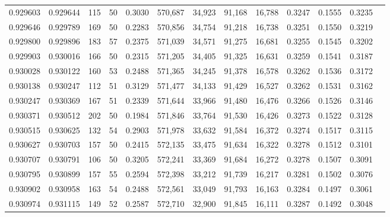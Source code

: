 \begin{tabular}{rrrrrrrrrrrrr}
0.929603 & 0.929644 &   115 &  50 &                                     0.3030 & 570,687 &  34,923 &  91,168 &  16,788 & 0.3247 & 0.1555 & 0.3235 \\
0.929646 & 0.929789 &   169 &  50 &                                     0.2283 & 570,856 &  34,754 &  91,218 &  16,738 & 0.3251 & 0.1550 & 0.3219 \\
0.929800 & 0.929896 &   183 &  57 &                                     0.2375 & 571,039 &  34,571 &  91,275 &  16,681 & 0.3255 & 0.1545 & 0.3202 \\
0.929903 & 0.930016 &   166 &  50 &                                     0.2315 & 571,205 &  34,405 &  91,325 &  16,631 & 0.3259 & 0.1541 & 0.3187 \\
0.930028 & 0.930122 &   160 &  53 &                                     0.2488 & 571,365 &  34,245 &  91,378 &  16,578 & 0.3262 & 0.1536 & 0.3172 \\
0.930138 & 0.930247 &   112 &  51 &                                     0.3129 & 571,477 &  34,133 &  91,429 &  16,527 & 0.3262 & 0.1531 & 0.3162 \\
0.930247 & 0.930369 &   167 &  51 &                                     0.2339 & 571,644 &  33,966 &  91,480 &  16,476 & 0.3266 & 0.1526 & 0.3146 \\
0.930371 & 0.930512 &   202 &  50 &                                     0.1984 & 571,846 &  33,764 &  91,530 &  16,426 & 0.3273 & 0.1522 & 0.3128 \\
0.930515 & 0.930625 &   132 &  54 &                                     0.2903 & 571,978 &  33,632 &  91,584 &  16,372 & 0.3274 & 0.1517 & 0.3115 \\
0.930627 & 0.930703 &   157 &  50 &                                     0.2415 & 572,135 &  33,475 &  91,634 &  16,322 & 0.3278 & 0.1512 & 0.3101 \\
0.930707 & 0.930791 &   106 &  50 &                                     0.3205 & 572,241 &  33,369 &  91,684 &  16,272 & 0.3278 & 0.1507 & 0.3091 \\
0.930795 & 0.930899 &   157 &  55 &                                     0.2594 & 572,398 &  33,212 &  91,739 &  16,217 & 0.3281 & 0.1502 & 0.3076 \\
0.930902 & 0.930958 &   163 &  54 &                                     0.2488 & 572,561 &  33,049 &  91,793 &  16,163 & 0.3284 & 0.1497 & 0.3061 \\
0.930974 & 0.931115 &   149 &  52 &                                     0.2587 & 572,710 &  32,900 &  91,845 &  16,111 & 0.3287 & 0.1492 & 0.3048 \\

\end{tabular}
